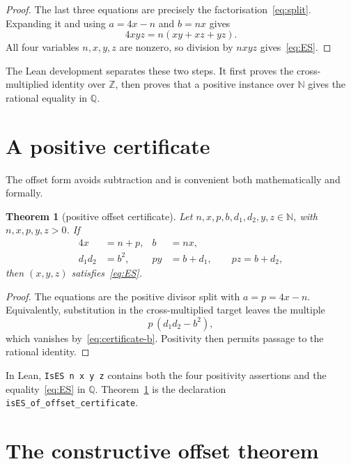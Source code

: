 \documentclass[11pt]{article}
\newtheorem{theorem}{Theorem}[section]
\theoremstyle{remark}
\newcommand{\N}{\mathbb{N}}
\newcommand{\Q}{\mathbb{Q}}
\newcommand{\Z}{\mathbb{Z}}
\begin{document}
\begin{proof}
The last three equations are precisely the
factorisation~\eqref{eq:split}.  Expanding it and using \(a=4x-n\) and \(b=nx\)
gives
\[
  4xyz=n(xy+xz+yz).
\]
All four variables \(n,x,y,z\) are nonzero, so division by \(nxyz\)
gives~\eqref{eq:ES}.
\end{proof}

The Lean development separates these two steps.  It first proves the
cross-multiplied identity over \(\Z\), then proves that a positive instance over
\(\N\) gives the rational equality in \(\Q\).

\section{A positive certificate}

The offset form avoids subtraction and is convenient both mathematically and
formally.

\begin{theorem}[positive offset certificate]\label{thm:certificate}
Let \(n,x,p,b,d_1,d_2,y,z\in\N\), with \(n,x,p,y,z>0\).  If
\begin{align}
  4x &= n+p,                 & b &= nx, \label{eq:certificate-a}\\
  d_1d_2 &= b^2,             & py &= b+d_1,\qquad pz=b+d_2, \label{eq:certificate-b}
\end{align}
then \((x,y,z)\) satisfies~\eqref{eq:ES}.
\end{theorem}

\begin{proof}
The equations are the positive divisor split with \(a=p=4x-n\).  Equivalently,
substitution in the cross-multiplied target leaves the multiple
\[
  p\,(d_1d_2-b^2),
\]
which vanishes by~\eqref{eq:certificate-b}.  Positivity then permits passage to
the rational identity.
\end{proof}

In Lean, \texttt{IsES n x y z} contains both the four positivity assertions and
the equality~\eqref{eq:ES} in \(\Q\).  Theorem~\ref{thm:certificate} is the
declaration \texttt{isES\_of\_offset\_certificate}.

\section{The constructive offset theorem}
\end{document}
